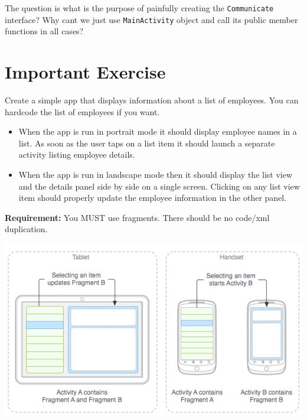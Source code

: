 The question is what is the purpose of painfully creating the \texttt{Communicate} interface? Why cant we just use \texttt{MainActivity} object and call its public member functions in all cases?


\section{Important Exercise}
Create a simple app that displays information about a list of employees. You can hardcode the list of employees if you want.
\begin{itemize}
	\item When the app is run in portrait mode it should display employee names in a list. As soon as the user taps on a list item it should launch a separate activity listing employee details.
	
	\item When the app is run in landscape mode then it should display the list view and the details panel side by side on a single screen. Clicking on any list view item should properly update the employee information in the other panel.
\end{itemize}

\textbf{Requirement:} You MUST use fragments. There should be no code/xml duplication.

\begin{center}
	\includegraphics[scale=\FigureScale]{chapters/ch11/images/1}
\end{center}
